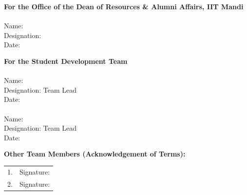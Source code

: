 \documentclass[11pt]{article}
\begin{document}
\vspace{1cm}
\begin{minipage}[t]{0.48\textwidth}
\textbf{For the Office of the Dean of Resources \& Alumni Affairs, IIT Mandi}\\[1.4cm]
\underline{\hspace{6.5cm}}\\
Name:\underline{\hspace{5cm}}\\[6pt]
Designation:\underline{\hspace{4.5cm}}\\[6pt]
Date:\underline{\hspace{5.5cm}}
\end{minipage}
\hfill
\begin{minipage}[t]{0.48\textwidth}
\textbf{For the Student Development Team}\\[6pt]
\underline{\hspace{6.5cm}}\\
Name:\underline{\hspace{5cm}}\\
Designation: Team Lead\\
Date:\underline{\hspace{5.5cm}}\\[10pt]
\underline{\hspace{6.5cm}}\\
Name:\underline{\hspace{5cm}}\\
Designation: Team Lead\\
Date:\underline{\hspace{5.5cm}}
\end{minipage}

\vspace{1cm}
\textbf{Other Team Members (Acknowledgement of Terms):}

\begin{tabular}{@{}p{7.5cm}p{6cm}@{}}
1. \underline{\hspace{6cm}} & Signature: \underline{\hspace{3.5cm}} \\[10pt]
2. \underline{\hspace{6cm}} & Signature: \underline{\hspace{3.5cm}} \\
\end{tabular}
\end{document}
